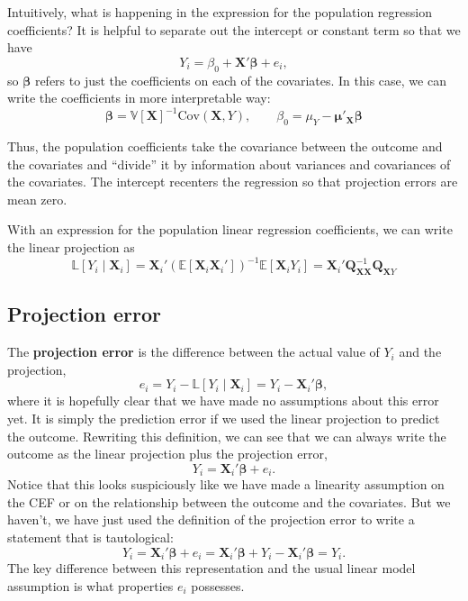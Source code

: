 \documentclass[
  letterpaper,
  DIV=11,
  numbers=noendperiod]{scrreprt}
\newcommand{\mb}{\symbf}
\newcommand{\E}{\mathbb{E}}
\newcommand{\V}{\mathbb{V}}
\newcommand{\bbL}{\mathbb{L}}
\newcommand{\X}{\mb{X}}
\newcommand{\bfbeta}{\mb{\beta}}
\theoremstyle{definition}
\theoremstyle{plain}
\theoremstyle{definition}
\theoremstyle{remark}
\begin{document}
\begin{tcolorbox}[enhanced jigsaw, title=\textcolor{quarto-callout-note-color}{\faInfo}\hspace{0.5em}{Note}, breakable, titlerule=0mm, opacityback=0, rightrule=.15mm, bottomrule=.15mm, colframe=quarto-callout-note-color-frame, coltitle=black, colbacktitle=quarto-callout-note-color!10!white, bottomtitle=1mm, toptitle=1mm, colback=white, arc=.35mm, opacitybacktitle=0.6, toprule=.15mm, leftrule=.75mm, left=2mm]

Intuitively, what is happening in the expression for the population
regression coefficients? It is helpful to separate out the intercept or
constant term so that we have \[ 
Y_{i} = \beta_{0} + \X'\bfbeta + e_{i},
\] so \(\bfbeta\) refers to just the coefficients on each of the
covariates. In this case, we can write the coefficients in more
interpretable way: \[ 
\bfbeta = \V[\X]^{-1}\text{Cov}(\X, Y), \qquad \beta_0 = \mu_Y - \mb{\mu}'_{\mb{X}}\bfbeta
\]

Thus, the population coefficients take the covariance between the
outcome and the covariates and ``divide'' it by information about
variances and covariances of the covariates. The intercept recenters the
regression so that projection errors are mean zero.

\end{tcolorbox}

With an expression for the population linear regression coefficients, we
can write the linear projection as \[ 
\bbL[Y_{i} \mid \X_{i}] = \X_{i}'\left(\E[\X_{i}\X_{i}']\right)^{-1}\E[\X_{i}Y_{i}] = \X_{i}'\mb{Q}_{\mb{XX}}^{-1}\mb{Q}_{\mb{X}Y}
\]

\hypertarget{projection-error}{%
\subsection{Projection error}\label{projection-error}}

The \textbf{projection error} is the difference between the actual value
of \(Y_i\) and the projection, \[ 
e_{i} = Y_{i} - \bbL[Y_{i} \mid \X_{i}] =  Y_i - \X_{i}'\bfbeta,
\] where it is hopefully clear that we have made no assumptions about
this error yet. It is simply the prediction error if we used the linear
projection to predict the outcome. Rewriting this definition, we can see
that we can always write the outcome as the linear projection plus the
projection error, \[ 
Y_{i} = \X_{i}'\bfbeta + e_{i}.
\] Notice that this looks suspiciously like we have made a linearity
assumption on the CEF or on the relationship between the outcome and the
covariates. But we haven't, we have just used the definition of the
projection error to write a statement that is tautological: \[ 
Y_{i} = \X_{i}'\bfbeta + e_{i} = \X_{i}'\bfbeta + Y_{i} - \X_{i}'\bfbeta = Y_{i}.
\] The key difference between this representation and the usual linear
model assumption is what properties \(e_{i}\) possesses.
\end{document}
